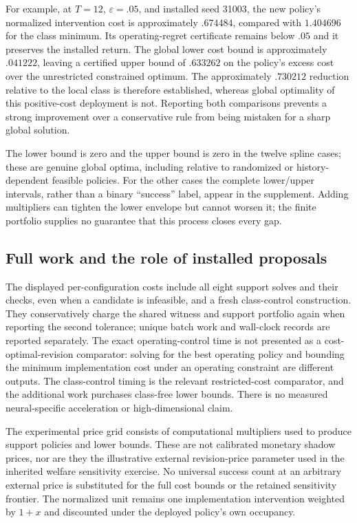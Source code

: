 For example, at $T=12$, $\varepsilon=.05$, and installed seed 31003, the new policy's normalized intervention cost is approximately $.674484$, compared with $1.404696$ for the class minimum. Its operating-regret certificate remains below $.05$ and it preserves the installed return. The global lower cost bound is approximately $.041222$, leaving a certified upper bound of $.633262$ on the policy's excess cost over the unrestricted constrained optimum. The approximately $.730212$ reduction relative to the local class is therefore established, whereas global optimality of this positive-cost deployment is not. Reporting both comparisons prevents a strong improvement over a conservative rule from being mistaken for a sharp global solution.

The lower bound is zero and the upper bound is zero in the twelve spline cases; these are genuine global optima, including relative to randomized or history-dependent feasible policies. For the other cases the complete lower/upper intervals, rather than a binary ``success'' label, appear in the supplement. Adding multipliers can tighten the lower envelope but cannot worsen it; the finite portfolio supplies no guarantee that this process closes every gap.

\subsection{Full work and the role of installed proposals}

The displayed per-configuration costs include all eight support solves and their checks, even when a candidate is infeasible, and a fresh class-control construction. They conservatively charge the shared witness and support portfolio again when reporting the second tolerance; unique batch work and wall-clock records are reported separately. The exact operating-control time is not presented as a cost-optimal-revision comparator: solving for the best operating policy and bounding the minimum implementation cost under an operating constraint are different outputs. The class-control timing is the relevant restricted-cost comparator, and the additional work purchases class-free lower bounds. There is no measured neural-specific acceleration or high-dimensional claim.

The experimental price grid consists of computational multipliers used to produce support policies and lower bounds. These are not calibrated monetary shadow prices, nor are they the illustrative external revision-price parameter used in the inherited welfare sensitivity exercise. No universal success count at an arbitrary external price is substituted for the full cost bounds or the retained sensitivity frontier. The normalized unit remains one implementation intervention weighted by $1+x$ and discounted under the deployed policy's own occupancy.

